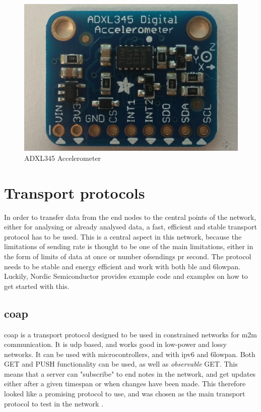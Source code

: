 \begin{figure}[ht]
    \centering
    \includegraphics[scale=0.32]{ADXL345.png}    \caption{ADXL345 Accelerometer}
    \label{fig:adxl345}
\end{figure}

\newpage

\section{Transport protocols}

In order to transfer data from the end nodes to the central points of the network, either for analysing or already analysed data, a fast, efficient and stable transport protocol has to be used. This is a central aspect in this network, because the limitations of sending rate is thought to be one of the main limitations, either in the form of limits of data at once or number ofsendings pr second. The protocol needs to be stable and energy efficient and work with both \gls{ble} and \gls{6lowpan}. Luckily, Nordic Semiconductor provides example code and examples on how to get started with this.

\subsection{\gls{coap}}


\gls{coap} is a transport protocol designed to be used in constrained networks for \gls{m2m} communication. It is \gls{udp} based, and works good in low-power and lossy networks. It can be used with microcontrollers, and with \gls{ipv6} and \gls{6lowpan}. Both GET and PUSH functionality can be used, as well as \textit{observable} GET. This means that a server can "subscribe" to end notes in the network, and get updates either after a given timespan or when changes have been made. This therefore looked like a promising protocol to use, and was chosen as the main transport protocol to test in the network \cite{shelby2014constrained}.

